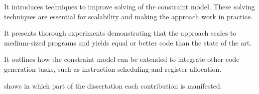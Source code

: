 \begin{contributions}
  \item {}
    It introduces techniques to improve solving of the \gls{constraint model}.
    These solving techniques are essential for scalability and making the
    approach work in practice.

  \item {}
    It presents thorough experiments demonstrating that the approach scales to
    medium-sized \glspl{program} and yields equal or better code than the state
    of the art.

  \item {}
    It outlines how the \gls{constraint model} can be extended to integrate
    other \gls{code generation} tasks, such as \gls{instruction scheduling} and
    \gls{register allocation}.
\end{contributions}
%
 shows in which part of the dissertation
each contribution is manifested.

